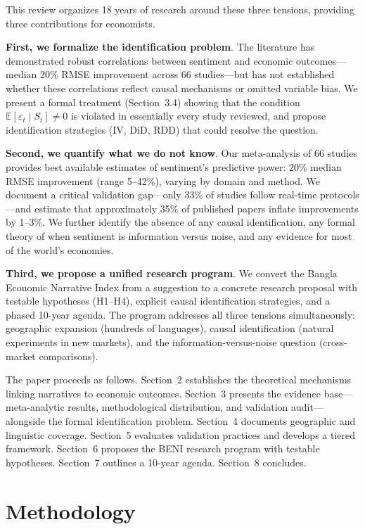 \documentclass[11pt]{article}
\begin{document}
This review organizes 18 years of research around these three tensions, providing three contributions for economists.

\textbf{First, we formalize the identification problem}. The literature has demonstrated robust correlations between sentiment and economic outcomes---median 20\% RMSE improvement across 66 studies---but has not established whether these correlations reflect causal mechanisms or omitted variable bias. We present a formal treatment (Section~3.4) showing that the condition $\mathbb{E}[\varepsilon_t \mid S_t] \neq 0$ is violated in essentially every study reviewed, and propose identification strategies (IV, DiD, RDD) that could resolve the question.

\textbf{Second, we quantify what we do not know}. Our meta-analysis of 66 studies provides best available estimates of sentiment's predictive power: 20\% median RMSE improvement (range 5--42\%), varying by domain and method. We document a critical validation gap---only 33\% of studies follow real-time protocols---and estimate that approximately 35\% of published papers inflate improvements by 1--3\%. We further identify the absence of any causal identification, any formal theory of when sentiment is information versus noise, and any evidence for most of the world's economies.

\textbf{Third, we propose a unified research program}. We convert the Bangla Economic Narrative Index from a suggestion to a concrete research proposal with testable hypotheses (H1--H4), explicit causal identification strategies, and a phased 10-year agenda. The program addresses all three tensions simultaneously: geographic expansion (hundreds of languages), causal identification (natural experiments in new markets), and the information-versus-noise question (cross-market comparisons).

The paper proceeds as follows. Section~2 establishes the theoretical mechanisms linking narratives to economic outcomes. Section~3 presents the evidence base---meta-analytic results, methodological distribution, and validation audit---alongside the formal identification problem. Section~4 documents geographic and linguistic coverage. Section~5 evaluates validation practices and develops a tiered framework. Section~6 proposes the BENI research program with testable hypotheses. Section~7 outlines a 10-year agenda. Section~8 concludes.

\section{Methodology}
\end{document}
